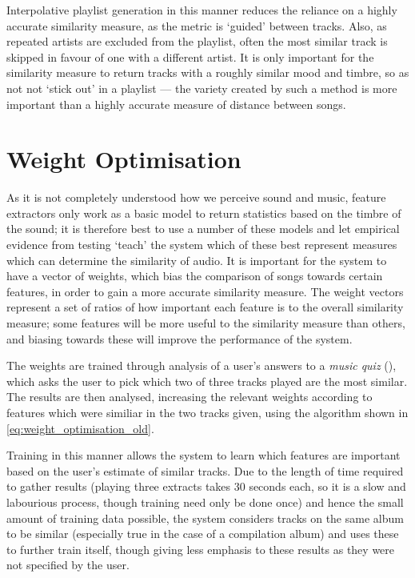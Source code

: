 Interpolative playlist generation in this manner reduces the reliance on a highly accurate similarity measure, as the metric is `guided' between tracks. Also, as repeated artists are excluded from the playlist, often the most similar track is skipped in favour of one with a different artist. It is only important for the similarity measure to return tracks with a roughly similar mood and timbre, so as not not `stick out' in a playlist --- the variety created by such a method is more important than a highly accurate measure of distance between songs.
\section{Weight Optimisation}
\label{text:method:weight_optimisation}
As it is not completely understood how we perceive sound and music, feature extractors only work as a basic model to return statistics based on the timbre of the sound; it is therefore best to use a number of these models and let empirical evidence from testing `teach' the system which of these best represent measures which can determine the similarity of audio. It is important for the system to have a vector of weights, which bias the comparison of songs towards certain features, in order to gain a more accurate similarity measure. The weight vectors represent a set of ratios of how important each feature is to the overall similarity measure; some features will be more useful to the similarity measure than others, and biasing towards these will improve the performance of the system.

The weights are trained through analysis of a user's answers to a \emph{music quiz} (), which asks the user to pick which two of three tracks played are the most similar. The results are then analysed, increasing the relevant weights according to features which were similiar in the two tracks given, using the algorithm shown in \ref{eq:weight_optimisation_old}.

Training in this manner allows the system to learn which features are important based on the user's estimate of similar tracks. Due to the length of time required to gather results (playing three extracts takes 30 seconds each, so it is a slow and labourious process, though training need only be done once) and hence the small amount of training data possible, the system considers tracks on the same album to be similar (especially true in the case of a compilation album) and uses these to further train itself, though giving less emphasis to these results as they were not specified by the user.

